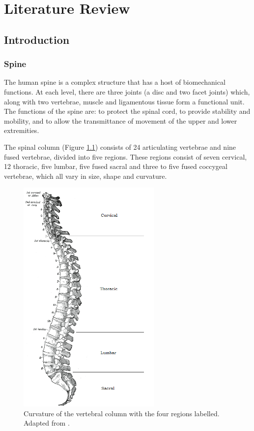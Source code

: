 \chapter{Literature Review}

\section{Introduction}
\subsection{Spine}\label{spine}

The human spine is a complex structure that has a host of biomechanical
functions. At each level, there are three joints (a disc and two facet
joints) which, along with two vertebrae, muscle and ligamentous tissue
form a functional unit. The functions of the spine are: to protect the spinal cord,
 to provide stability and mobility, and to allow the transmittance of
movement of the upper and lower extremities.

The spinal column (Figure \ref{fig:spine}) consists of 24
articulating vertebrae and nine fused vertebrae, divided into five regions. These regions consist of seven
cervical, 12 thoracic, five lumbar, five fused sacral and three to five
fused coccygeal vertebrae, which all vary in size, shape and curvature.

\begin{figure}[hbt]

\centering
  \includegraphics[width=7cm]{images/spine.png}
  \caption{Curvature of the vertebral column with the four regions labelled.
Adapted from \cite{Gray1918}.}
\label{fig:spine}
\end{figure}




